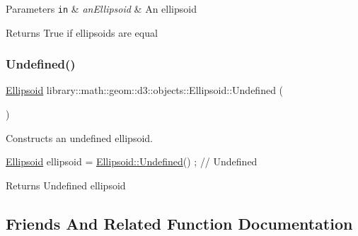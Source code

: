 \begin{DoxyParams}[1]{Parameters}
\mbox{\tt in}  & {\em an\+Ellipsoid} & An ellipsoid \\
\hline
\end{DoxyParams}
\begin{DoxyReturn}{Returns}
True if ellipsoids are equal 
\end{DoxyReturn}
\mbox{\label{classlibrary_1_1math_1_1geom_1_1d3_1_1objects_1_1_ellipsoid_affcef36f736e6d21a0246a149b8fb688}} 
\subsubsection{\texorpdfstring{Undefined()}{Undefined()}}
{\footnotesize\ttfamily \hyperlink{classlibrary_1_1math_1_1geom_1_1d3_1_1objects_1_1_ellipsoid}{Ellipsoid} library\+::math\+::geom\+::d3\+::objects\+::\+Ellipsoid\+::\+Undefined (\begin{DoxyParamCaption}{ }\end{DoxyParamCaption})\hspace{0.3cm}{\ttfamily [static]}}



Constructs an undefined ellipsoid. 


\begin{DoxyCode}
\hyperlink{classlibrary_1_1math_1_1geom_1_1d3_1_1objects_1_1_ellipsoid_aae81fe0edc7f0e8d4590ea89ae73cb14}{Ellipsoid} ellipsoid = \hyperlink{classlibrary_1_1math_1_1geom_1_1d3_1_1objects_1_1_ellipsoid_affcef36f736e6d21a0246a149b8fb688}{Ellipsoid::Undefined}() ; \textcolor{comment}{// Undefined}
\end{DoxyCode}


\begin{DoxyReturn}{Returns}
Undefined ellipsoid 
\end{DoxyReturn}


\subsection{Friends And Related Function Documentation}
\mbox{\label{classlibrary_1_1math_1_1geom_1_1d3_1_1objects_1_1_ellipsoid_a95f4f6dc4d64843c673c7ac965468a2c}} 
